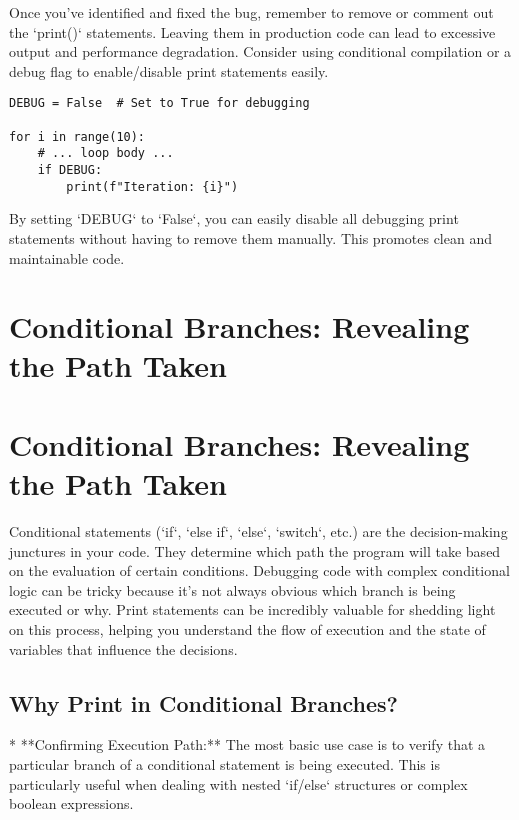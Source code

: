 \documentclass{article}
\begin{document}
{{{Once you've identified and fixed the bug, remember to remove or comment out the `print()` statements. Leaving them in production code can lead to excessive output and performance degradation. Consider using conditional compilation or a debug flag to enable/disable print statements easily.

\begin{verbatim}
DEBUG = False  # Set to True for debugging

for i in range(10):
    # ... loop body ...
    if DEBUG:
        print(f"Iteration: {i}")
\end{verbatim}

By setting `DEBUG` to `False`, you can easily disable all debugging print statements without having to remove them manually. This promotes clean and maintainable code.

\newpage

\section*{Conditional Branches: Revealing the Path Taken} %
\label{chapter-3-3-Conditional_Branches__Revealing_the_Path}

\section*{Conditional Branches: Revealing the Path Taken}

Conditional statements (`if`, `else if`, `else`, `switch`, etc.) are the decision-making junctures in your code. They determine which path the program will take based on the evaluation of certain conditions. Debugging code with complex conditional logic can be tricky because it's not always obvious which branch is being executed or why. Print statements can be incredibly valuable for shedding light on this process, helping you understand the flow of execution and the state of variables that influence the decisions.

\subsection*{Why Print in Conditional Branches?}

*   **Confirming Execution Path:**  The most basic use case is to verify that a particular branch of a conditional statement is being executed.  This is particularly useful when dealing with nested `if/else` structures or complex boolean expressions.

}}}
\end{document}
